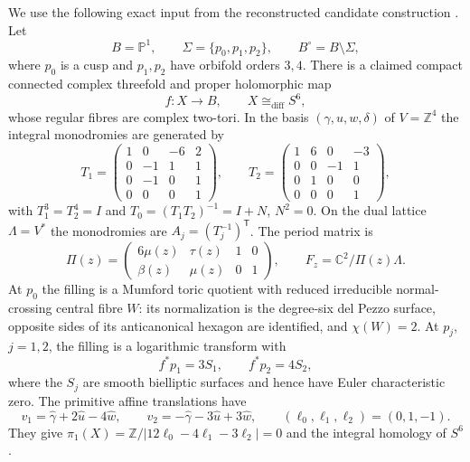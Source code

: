 We use the following exact input from the reconstructed candidate
construction \cite{h24:AlpogeS6_2026}.  Let
\[
 B=\mathbb P^1,\qquad \Sigma=\{p_0,p_1,p_2\},\qquad
 B^\circ=B\setminus\Sigma,
\]
where $p_0$ is a cusp and $p_1,p_2$ have orbifold orders $3,4$.
There is a claimed compact connected complex threefold and proper
holomorphic map
\[
 f:X\longrightarrow B,
 \qquad X\cong_{\mathrm{diff}}S^6,
\]
whose regular fibres are complex two-tori.  In the basis
$(\gamma,u,w,\delta)$ of $V=\mathbb Z^4$ the integral monodromies are generated by
\begin{equation}
 T_1=
 \begin{pmatrix}1&0&-6&2\\0&-1&1&1\\0&-1&0&1\\0&0&0&1\end{pmatrix},
 \qquad
 T_2=
 \begin{pmatrix}1&6&0&-3\\0&0&-1&1\\0&1&0&0\\0&0&0&1\end{pmatrix},
 \label{h24:eq:original-T}
\end{equation}
with $T_1^3=T_2^4=I$ and
$T_0=(T_1T_2)^{-1}=I+N$, $N^2=0$.  On the dual lattice
$\Lambda=V^*$ the monodromies are
$A_j=(T_j^{-1})^{\mathsf T}$.  The period matrix is
\begin{equation}
 \Pi(z)=
 \begin{pmatrix}6\mu(z)&\tau(z)&1&0\\
                 \beta(z)&\mu(z)&0&1\end{pmatrix},
 \qquad F_z=\mathbb C^2/\Pi(z)\Lambda .
 \label{h24:eq:original-period}
\end{equation}
At $p_0$ the filling is a Mumford toric quotient with reduced irreducible
normal-crossing central fibre $W$: its normalization is the degree-six
del Pezzo surface, opposite sides of its anticanonical hexagon are
identified, and $\chi(W)=2$.  At $p_j$, $j=1,2$, the filling is a
logarithmic transform with
\[
 f^*p_1=3S_1,\qquad f^*p_2=4S_2,
\]
where the $S_j$ are smooth bielliptic surfaces and hence have Euler
characteristic zero.  The primitive affine translations have
\begin{equation}
 v_1=\widehat\gamma+2\widehat u-4\widehat w,\qquad
 v_2=-\widehat\gamma-3\widehat u+3\widehat w,\qquad
 (\ell_0,\ell_1,\ell_2)=(0,1,-1).
 \label{h24:eq:original-twists}
\end{equation}
They give
$\pi_1(X)=\mathbb Z/|12\ell_0-4\ell_1-3\ell_2|=0$ and the integral homology of
$S^6$.

